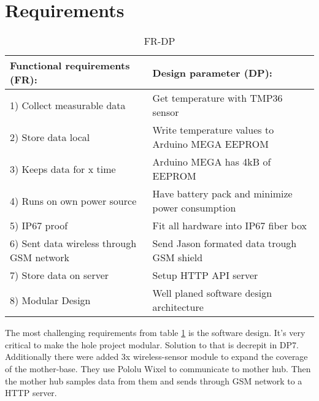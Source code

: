 \section{Requirements}\label{requirements}
\begin{table}[h!]
	\caption{FR-DP}
	\label{tbl:FRDP}
\begin{tabular}{|p{8cm}|p{8cm}|}
		\hline \textbf{Functional requirements (FR):} & \textbf{Design parameter (DP):} \\ 
		\hline 1) Collect measurable data &   Get temperature with TMP36 sensor\\
		\hline 2) Store data local &   Write temperature values to Arduino MEGA EEPROM \\
		\hline 3) Keeps data for x time &  Arduino MEGA \cite{arduinoMega} has 4kB of EEPROM \\
		\hline 4) Runs on own power source & Have battery pack and minimize power consumption \\ 
		\hline 5) IP67 proof &   Fit all hardware into IP67 fiber box\\
		\hline 6) Sent data wireless through GSM network & Send Jason formated data trough GSM shield \\ 
		\hline 7) Store data on server & Setup HTTP API server \\ 
		\hline 8) Modular Design & Well planed software design architecture \\ 
		\hline
	\end{tabular}
\end{table}

The most challenging requirements from table \ref{tbl:FRDP} is the software design. It's very critical to make the hole project modular. Solution to that is decrepit in DP7. Additionally there were added 3x wireless-sensor module to expand the coverage of the mother-base. They use Pololu Wixel to communicate to mother hub. Then the mother hub samples data from them and sends through GSM network to a HTTP server.